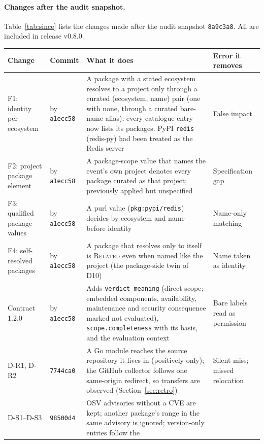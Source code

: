 \documentclass[11pt,a4paper]{article}
\newcommand{\code}[1]{\texttt{#1}}
\newcommand{\pincommit}{\code{8a9c3a8}}
\newcommand{\release}{v0.8.0}
\begin{document}
\paragraph{Changes after the audit snapshot.} Table~\ref{tab:since}
lists the changes made after the audit snapshot \pincommit{}. All are
included in release \release{}.

\begin{table}[h]
\centering
\footnotesize
\begin{tabularx}{\linewidth}{@{}>{\raggedright\arraybackslash}p{2.4cm} >{\raggedright\arraybackslash}p{1.2cm} >{\raggedright\arraybackslash}X >{\raggedright\arraybackslash}p{2.3cm}@{}}
\toprule
Change & Commit & What it does & Error it removes \\
\midrule
F1: identity per ecosystem & by \code{a1ecc58} & A package with a stated ecosystem
  resolves to a project only through a curated (ecosystem, name) pair
  (one with none, through a curated bare-name alias); every catalogue entry now
  lists its packages. PyPI \code{redis} (redis-py) had been treated as
  the Redis server & False impact \\
F2: project package element & by \code{a1ecc58} & A package-scope value that names the
  event's own project denotes every package curated as that project;
  previously applied but unspecified & Specification gap \\
F3: qualified package values & by \code{a1ecc58} & A purl value (\code{pkg:pypi/redis})
  decides by ecosystem and name before identity & Name-only matching \\
F4: self-resolved packages & by \code{a1ecc58} & A package that resolves only to itself is
  \textsc{Related} even when named like the project (the package-side
  twin of D10) & Name taken as identity \\
Contract 1.2.0 & by \code{a1ecc58} & Adds \code{verdict\_meaning} (direct scope; embedded
  components, availability, maintenance and security consequence marked
  not evaluated), \code{scope.completeness} with its basis, and the
  evaluation context & Bare labels read as permission \\
D-R1, D-R2 & \code{7744ca0} & A Go module reaches the source repository it lives in
  (positively only); the GitHub collector follows one same-origin
  redirect, so transfers are observed (Section~\ref{sec:retro}) &
  Silent miss; missed relocation \\
D-S1--D-S3 & \code{98500d4} & OSV advisories without a CVE are kept; another package's
  range in the same advisory is ignored; version-only entries follow the

\end{tabularx}
\end{table}
\end{document}
